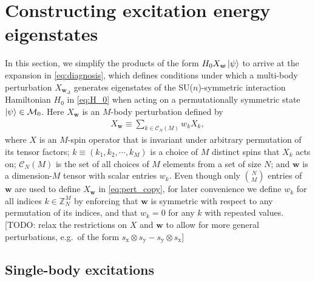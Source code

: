 \documentclass[nofootinbib,notitlepage,11pt]{revtex4-2}
\newcommand{\p}[1]{\left(#1\right)} %
\newcommand{\m}{\bm} %
\newcommand{\1}{\mathds{1}}
\newcommand{\x}{\text{x}}
\newcommand{\y}{\text{y}}
\newcommand{\C}{\mathcal{C}}
\newcommand{\M}{\mathcal{M}}
\newcommand{\ZZ}{\mathbb{Z}}
\newcommand{\red}[1]{{\color{red} #1}}
\begin{document}
\section{Constructing excitation energy eigenstates}
\label{sec:eigenstates}

In this section, we simplify the products of the form
$H_0X_{\m w}\ket\psi$ to arrive at the expansion in
\eqref{eq:diagnosis}, which defines conditions under which a
multi-body perturbation $X_{\m w_\Delta}$ generates eigenstates of the
SU($n$)-symmetric interaction Hamiltonian $H_0$ in \eqref{eq:H_0} when
acting on a permutationally symmetric state $\ket\psi\in\M_0$.  Here
$X_{\m w}$ is an $M$-body perturbation defined by
\begin{align}
  X_{\m w} \equiv \sum_{k\in\C_N\p{M}} w_k X_k,
  \label{eq:pert_copy}
\end{align}
where $X$ is an $M$-spin operator that is invariant under arbitrary
permutation of its tensor factors; $k\equiv\p{k_1,k_2,\cdots,k_M}$ is
a choice of $M$ distinct spins that $X_k$ acts on; $\C_N\p{M}$ is the
set of all choices of $M$ elements from a set of size $N$; and $\m w$
is a dimension-$M$ tensor with scalar entries $w_k$.  Even though only
${N\choose M}$ entries of $\m w$ are used to define $X_{\m w}$ in
\eqref{eq:pert_copy}, for later convenience we define $w_k$ for all
indices $k\in\ZZ_N^M$ by enforcing that $\m w$ is symmetric with
respect to any permutation of its indices, and that $w_k=0$ for any
$k$ with repeated values. \red{[TODO: relax the restrictions on $X$
  and $\m w$ to allow for more general perturbations, e.g.~of the form
  $s_\x\otimes s_\y-s_\y\otimes s_\x$]}

\subsection{Single-body excitations}
\label{sec:single_body_eigenstates}
\end{document}
